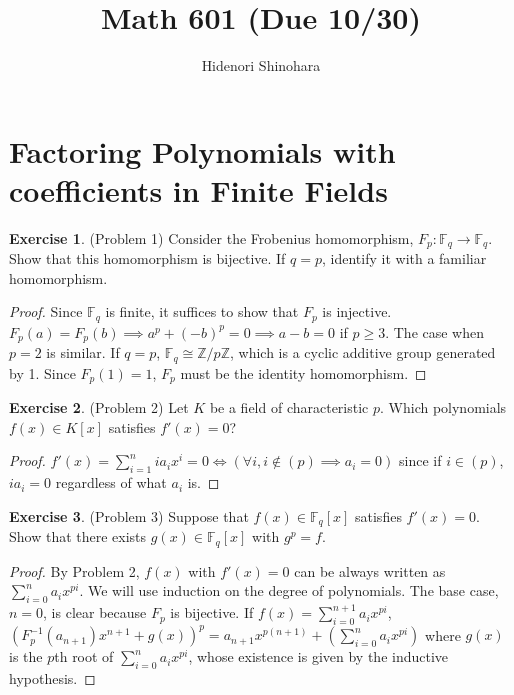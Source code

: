\documentclass[12pt, psamsfonts]{amsart}
\theoremstyle{definition}
\newtheorem*{exer}{Exercise}
\theoremstyle{remark}
\numberwithin{equation}{section}
\begin{document}
\title{Math 601 (Due 10/30)}
\author{Hidenori Shinohara}
\maketitle

\tableofcontents

\section{Factoring Polynomials with coefficients in Finite Fields}

\begin{exer}{(Problem 1)}
  Consider the Frobenius homomorphism, $F_p: \mathbb{F}_q \rightarrow \mathbb{F}_q$.
  Show that this homomorphism is bijective.
  If $q = p$, identify it with a familiar homomorphism.
\end{exer}

\begin{proof}
  Since $\mathbb{F}_q$ is finite, it suffices to show that $F_p$ is injective.
  $F_p(a) = F_p(b) \implies a^p + (-b)^p = 0 \implies a - b = 0$ if $p \geq 3$.
  The case when $p = 2$ is similar.
  If $q = p$, $\mathbb{F}_q \cong \mathbb{Z}/p\mathbb{Z}$, which is a cyclic additive group generated by 1.
  Since $F_p(1) = 1$, $F_p$ must be the identity homomorphism.
\end{proof}

\begin{exer}{(Problem 2)}
  Let $K$ be a field of characteristic $p$.
  Which polynomials $f(x) \in K[x]$ satisfies $f'(x) = 0$?
\end{exer}

\begin{proof}
  $f'(x) = \sum_{i=1}^{n} ia_ix^i = 0 \iff (\forall i, i \notin (p) \implies a_i = 0)$ since if $i \in (p)$, $ia_i = 0$ regardless of what $a_i$ is.
\end{proof}

\begin{exer}{(Problem 3)}
  Suppose that $f(x) \in \mathbb{F}_q[x]$ satisfies $f'(x) = 0$.
  Show that there exists $g(x) \in \mathbb{F}_q[x]$ with $g^p = f$.
\end{exer}

\begin{proof}
  By Problem 2, $f(x)$ with $f'(x) = 0$ can be always written as $\sum_{i=0}^{n} a_ix^{pi}$.
  We will use induction on the degree of polynomials.
  The base case, $n = 0$, is clear because $F_p$ is bijective.
  If $f(x) = \sum_{i=0}^{n+1} a_ix^{pi}$, $(F_p^{-1}(a_{n+1})x^{n+1} + g(x))^p = a_{n+1}x^{p(n+1)} + (\sum_{i=0}^{n} a_ix^{pi})$ where $g(x)$ is the $p$th root of $\sum_{i=0}^{n} a_ix^{pi}$, whose existence is given by the inductive hypothesis.
\end{proof}
\end{document}

